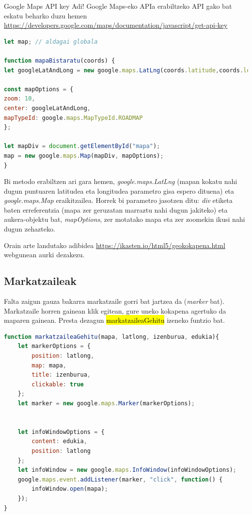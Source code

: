 \begin{alertinfo}{Google Maps API key}
Adi! Google Maps-eko APIa erabiltzeko API gako bat eskatu beharko duzu hemen \href{https://developers.google.com/maps/documentation/javascript/get-api-key}{https://developers.google.com/maps/documentation/javascript/get-api-key}
\end{alertinfo}


\begin{lstlisting}[language=JavaScript]
let map; // aldagai globala

function mapaBistaratu(coords) {
let googleLatAndLong = new google.maps.LatLng(coords.latitude,coords.longitude);

const mapOptions = {
zoom: 10,
center: googleLatAndLong,
mapTypeId: google.maps.MapTypeId.ROADMAP
};

let mapDiv = document.getElementById("mapa");
map = new google.maps.Map(mapDiv, mapOptions);
}
\end{lstlisting}

Bi metodo erabiltzen ari gara hemen, 
\textit{google.maps.LatLng} (mapan kokatu nahi dugun puntuaren latitudea eta longitudea parametro gisa espero dituena)  eta \textit{google.maps.Map} eraikitzailea. Horrek bi parametro jasotzen ditu: \textit{div} etiketa baten erreferentzia (mapa zer geruzatan marraztu nahi dugun jakiteko) eta aukera-objektu bat, \textit{mapOptions}, zer motatako mapa eta zer zoomekin ikusi nahi dugun zehazteko.

Orain arte landutako adibidea \href{https://ikasten.io/html5/geokokapena.html}{https://ikasten.io/html5/geokokapena.html} webgunean aurki dezakezu.

\subsection{Markatzaileak}
Falta zaigun gauza bakarra markatzaile gorri bat jartzea da (\textit{marker} bat). Markatzaile horren gainean klik egitean, gure uneko kokapena agertuko da maparen gainean. Presta dezagun \hl{markatzaileaGehitu} izeneko funtzio bat. 

\begin{lstlisting}[language=JavaScript]
function markatzaileaGehitu(mapa, latlong, izenburua, edukia){
    let markerOptions = {
        position: latlong,
        map: mapa,
        title: izenburua,
        clickable: true
    };
    let marker = new google.maps.Marker(markerOptions);
    

    let infoWindowOptions = {
        content: edukia,
        position: latlong
    };
    let infoWindow = new google.maps.InfoWindow(infoWindowOptions);
    google.maps.event.addListener(marker, "click", function() {
        infoWindow.open(mapa);
    });
}
\end{lstlisting}

